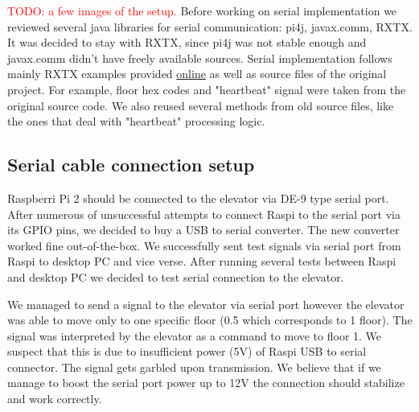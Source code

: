 \documentclass[a4paper, 12pt]{article}
\newcommand\todo[1]{\textcolor{red}{#1}}
\begin{document}
\todo{TODO: a few images of the setup.}
Before working on serial implementation we reviewed several java libraries for serial communication: pi4j, javax.comm, RXTX.
It was decided to stay with RXTX, since pi4j was not stable enough and javax.comm didn't have freely available sources.
Serial implementation follows mainly RXTX examples provided \href{http://rxtx.qbang.org/wiki/index.php/Two_way_communcation_with_the_serial_port}{online} as well as source files of the original project.
For example, floor hex codes and "heartbeat" signal were taken from the original source code.
We also reused several methods from old source files, like the ones that deal with "heartbeat" processing logic.

\subsection{Serial cable connection setup}
\label{sec:Serial_cable_connection_setup}
Raspberri Pi 2 should be connected to the elevator via DE-9 type serial port.
After numerous of unsuccessful attempts to connect Raspi to the serial port via its GPIO pins, we decided to buy a USB to serial converter. 
The new converter worked fine out-of-the-box.
We successfully sent test signals via serial port from Raspi to desktop PC and vice verse.
After running several tests between Raspi and desktop PC we decided to test serial connection to the elevator.

We managed to send a signal to the elevator via serial port however the elevator was able to move only to one specific floor (0.5 which corresponds to 1 floor).
The signal was interpreted by the elevator as a command to move to floor 1.
We suspect that this is due to insufficient power (5V) of Raspi USB to serial connector.
The signal gets garbled upon transmission.
We believe that if we manage to boost the serial port power up to 12V the connection should stabilize and work correctly.
\end{document}
